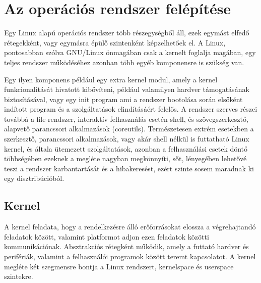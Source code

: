 

\section{Az operációs rendszer felépítése}

Egy Linux alapú operációs rendszer több részegységből áll, ezek egymást
elfedő rétegekként, vagy egymásra épülő szintenként képzelhetőek el. A Linux,
pontosabban szólva GNU/Linux önmagában csak a kernelt foglalja magában, egy
teljes rendszer működéséhez azonban több egyéb komponensre is szükség van.

Egy ilyen komponens például egy extra kernel modul, amely a kernel
funkcionalitását hivatott kibővíteni, például valamilyen hardver támogatásának
biztosításával, vagy egy init program ami a rendszer bootolása során elsőként
indított program és a szolgáltatások elindításáért felelős. A rendszer szerves
részei továbbá a file-rendszer, interaktív felhasználás esetén shell, és
szövegszerkesztő, alapvető parancssori alkalmazások (coreutils). Természetesen
extrém esetekben a szerkesztő, parancssori alkalmazások, vagy akár shell nélkül
is futtatható Linux kernel, és általa ütemezett szolgáltatások, azonban a
felhasználási esetek döntő többségében ezeknek a megléte nagyban megkönnyíti,
sőt, lényegében lehetővé teszi a rendszer karbantartását és a hibakeresést, ezért
szinte sosem maradnak ki egy disztribúcióból.

\subsection{Kernel}
 
A kernel feladata, hogy a rendelkezésre álló erőforrásokat elossza a
végrehajtandó feladatok között, valamint platformot adjon ezen feladatok közötti
kommunikációnak. Absztrakciós rétegként működik, amely a futtató hardver és
perifériák, valamint a felhasználói programok között teremt kapcsolatot. A kernel
megléte két szegmensre bontja a Linux rendszert, kernelspace és userspace
szintekre.

